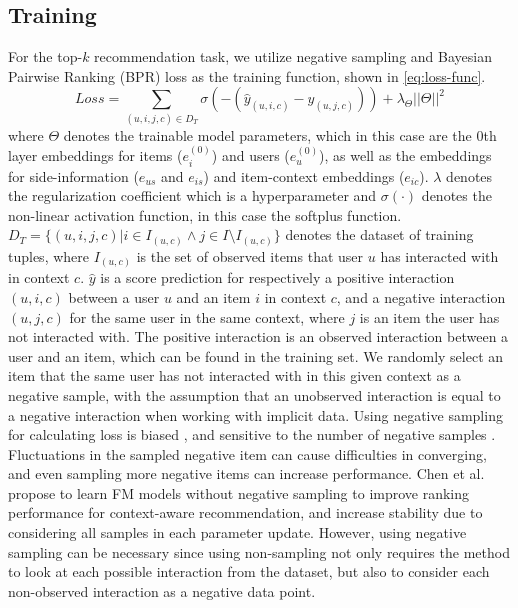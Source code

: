 \subsection{Training}\label{subsec:csgcn_is_training}
For the top-$k$ recommendation task, we utilize negative sampling and Bayesian Pairwise Ranking (BPR) loss \cite{BPR} as the training function, shown in \autoref{eq:loss-func}.
\begin{equation}\label{eq:loss-func}
    Loss = \sum_{(u,i,j,c) \in D_T} \sigma(-(\hat{y}_{(u,i,c)} - \hat{y}_{(u,j,c)})) + \lambda_\Theta ||\Theta||^2
\end{equation}
where $\Theta$ denotes the trainable model parameters, which in this case are the 0th layer embeddings for items ($e_{i}^{(0)}$) and users ($e_{u}^{(0)}$), as well as the embeddings for side-information ($e_{us}$ and $e_{is}$) and item-context embeddings ($e_{ic}$).
$\lambda$ denotes the regularization coefficient which is a hyperparameter and $\sigma(\cdot)$ denotes the non-linear activation function, in this case the softplus function.\\ 
$D_T = \{(u,i,j,c) | i \in I_{(u,c)} \wedge  j \in I \setminus I_{(u,c)}\}$ denotes the dataset of training tuples, where $I_{(u,c)}$ is the set of observed items that user $u$ has interacted with in context $c$.
$\hat{y}$ is a score prediction for respectively a positive interaction $(u,i,c)$ between a user $u$ and an item $i$ in context $c$, and a negative interaction $(u,j,c)$ for the same user in the same context, where $j$ is an item the user has not interacted with.
The positive interaction is an observed interaction between a user and an item, which can be found in the training set.
We randomly select an item that the same user has not interacted with in this given context as a negative sample, with the assumption that an unobserved interaction is equal to a negative interaction when working with implicit data. 
Using negative sampling for calculating loss is biased \cite{nonsampling, NegativeSampling}, and sensitive to the number of negative samples \cite{NCF}.
Fluctuations in the sampled negative item can cause difficulties in converging, and even sampling more negative items can increase performance.
Chen et al. \cite{nonsampling} propose to learn FM models without negative sampling to improve ranking performance for context-aware recommendation, and increase stability due to considering all samples in each parameter update.
However, using negative sampling can be necessary since using non-sampling not only requires the method to look at each possible interaction from the dataset, but also to consider each non-observed interaction as a negative data point.
